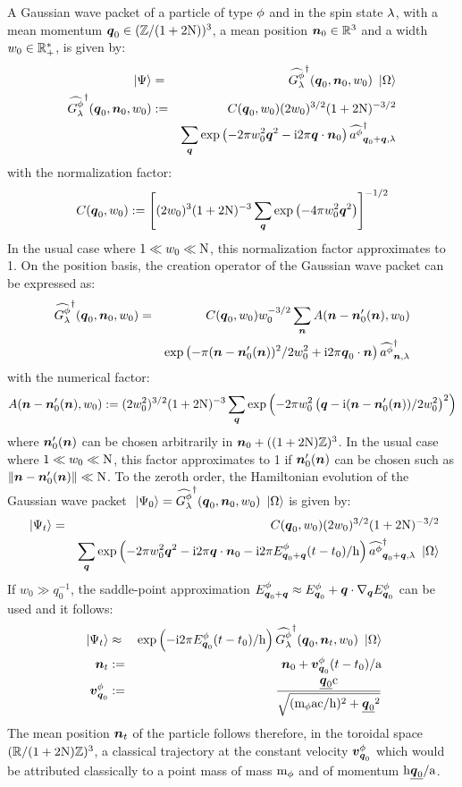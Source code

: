 \documentclass[10pt,a4paper,twoside,openany]{book}
\begin{document}
A Gaussian wave packet of a particle of type $\pt$ and in the spin state $\sp$, with a mean momentum $\q_0 \in (\IZ/(1+2\N))^3$, a mean position $\n_0 \in \IR^3$ and a width $w_0 \in \IR_+^*$, is given by:
\begin{eqnarray*}
\ket \Psi & = & \dop{G^\pt_\sp}(\q_0,\n_0,w_0) \ket \vac \\
\dop{G^\pt_\sp}(\q_0,\n_0,w_0) & \eqdef & C(\q_0,w_0) (2w_0)^{3/2} (1+2\N)^{-3/2} \\
&& \sum_{\q} \exp{-2 \pi w_0^2 \q^2 - \i 2 \pi \q \ssp \n_0} \cop\pt{\q_0+\q}\sp
\end{eqnarray*}
with the normalization factor:
\begin{equation*}
C(\q_0,w_0) \eqdef \left[ (2w_0)^3 (1+2\N)^{-3} \sum_{\q} \exp{-4 \pi w_0^2 \q^2} \right]^{-1/2}
\end{equation*}
In the usual case where $1 \ll w_0 \ll \N$, this normalization factor approximates to 1. On the position basis, the creation operator of the Gaussian wave packet can be expressed as:
\begin{eqnarray*}
\dop{G^\pt_\sp}(\q_0,\n_0,w_0) & = & C(\q_0,w_0) w_0^{-3/2} \sum_{\n} A(\n - \n_0'(\n),w_0) \\
&& \exp{-\pi (\n - \n_0'(\n))^2/2 w_0^2 + \i 2 \pi \q_0 \ssp \n} \cop\pt\n\sp
\end{eqnarray*}
with the numerical factor:
\begin{equation*}
A(\n - \n_0'(\n),w_0) \eqdef (2w_0^2)^{3/2} (1+2\N)^{-3} \sum_{\q} \exp{-2 \pi w_0^2 \left( \q - \i (\n - \n_0'(\n))/2 w_0^2 \right)^2}
\end{equation*}
where $\n_0'(\n)$ can be chosen arbitrarily in $\n_0 + ((1+2\N) \IZ)^3$. In the usual case where $1 \ll w_0 \ll \N$, this factor approximates to 1 if $\n_0'(\n)$ can be chosen such as $\| \n-\n_0'(\n) \| \ll \N$. To the zeroth order, the Hamiltonian evolution of the Gaussian wave packet $\ket{\Psi_0} = \dop{G^\pt_\sp}(\q_0,\n_0,w_0) \ket \vac$ is given by:
\begin{eqnarray*}
\ket{\Psi_t} & = & C(\q_0,w_0) (2w_0)^{3/2} (1+2\N)^{-3/2} \\
&& \sum_{\q} \exp{-2 \pi w_0^2 \q^2 - \i 2 \pi \q \ssp \n_0 -\i 2 \pi \Ek \pt {\q_0+\q} (t - t_0) / \h} \cop\pt{\q_0+\q}\sp \ket \vac
\end{eqnarray*}
If $w_0 \gg q_0^{-1}$, the saddle-point approximation $\Ek \pt {\q_0+\q} \approx \Ek \pt {\q_0} + \q \ssp \nabla_{\q} \Ek \pt {\q_0}$ can be used and it follows:
\begin{eqnarray*}
\ket{\Psi_t} & \approx & \exp{-\i 2 \pi \Ek \pt {\q_0} (t - t_0) / \h} \dop{G^\pt_\sp}(\q_0,\n_t,w_0) \ket \vac \\
\n_t & \eqdef & \n_0 + \vk \pt {\q_0} (t - t_0) / \a \\
\vk \pt {\q_0} & \eqdef & \frac{\eqp{\q_0} \c}{\sqrt{(\mp \pt \a \c / \h)^2 + \eqp{\q_0}^2}}
\end{eqnarray*}
The mean position $\n_t$ of the particle follows therefore, in the toroidal space $(\IR / (1+2\N)\IZ)^3$,  a classical trajectory at the constant velocity $\vk \pt {\q_0}$ which would be attributed classically to a point mass of mass $\mp \pt$ and of momentum $\h \eqp{\q_0} / \a$.
\end{document}

